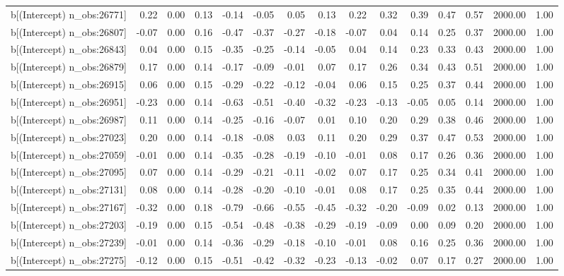 \begin{table}[ht]
\begin{tabular}{rrrrrrrrrrrrrrr}
  b[(Intercept) n\_obs:26771] & 0.22 & 0.00 & 0.13 & -0.14 & -0.05 & 0.05 & 0.13 & 0.22 & 0.32 & 0.39 & 0.47 & 0.57 & 2000.00 & 1.00 \\ 
  b[(Intercept) n\_obs:26807] & -0.07 & 0.00 & 0.16 & -0.47 & -0.37 & -0.27 & -0.18 & -0.07 & 0.04 & 0.14 & 0.25 & 0.37 & 2000.00 & 1.00 \\ 
  b[(Intercept) n\_obs:26843] & 0.04 & 0.00 & 0.15 & -0.35 & -0.25 & -0.14 & -0.05 & 0.04 & 0.14 & 0.23 & 0.33 & 0.43 & 2000.00 & 1.00 \\ 
  b[(Intercept) n\_obs:26879] & 0.17 & 0.00 & 0.14 & -0.17 & -0.09 & -0.01 & 0.07 & 0.17 & 0.26 & 0.34 & 0.43 & 0.51 & 2000.00 & 1.00 \\ 
  b[(Intercept) n\_obs:26915] & 0.06 & 0.00 & 0.15 & -0.29 & -0.22 & -0.12 & -0.04 & 0.06 & 0.15 & 0.25 & 0.37 & 0.44 & 2000.00 & 1.00 \\ 
  b[(Intercept) n\_obs:26951] & -0.23 & 0.00 & 0.14 & -0.63 & -0.51 & -0.40 & -0.32 & -0.23 & -0.13 & -0.05 & 0.05 & 0.14 & 2000.00 & 1.00 \\ 
  b[(Intercept) n\_obs:26987] & 0.11 & 0.00 & 0.14 & -0.25 & -0.16 & -0.07 & 0.01 & 0.10 & 0.20 & 0.29 & 0.38 & 0.46 & 2000.00 & 1.00 \\ 
  b[(Intercept) n\_obs:27023] & 0.20 & 0.00 & 0.14 & -0.18 & -0.08 & 0.03 & 0.11 & 0.20 & 0.29 & 0.37 & 0.47 & 0.53 & 2000.00 & 1.00 \\ 
  b[(Intercept) n\_obs:27059] & -0.01 & 0.00 & 0.14 & -0.35 & -0.28 & -0.19 & -0.10 & -0.01 & 0.08 & 0.17 & 0.26 & 0.36 & 2000.00 & 1.00 \\ 
  b[(Intercept) n\_obs:27095] & 0.07 & 0.00 & 0.14 & -0.29 & -0.21 & -0.11 & -0.02 & 0.07 & 0.17 & 0.25 & 0.34 & 0.41 & 2000.00 & 1.00 \\ 
  b[(Intercept) n\_obs:27131] & 0.08 & 0.00 & 0.14 & -0.28 & -0.20 & -0.10 & -0.01 & 0.08 & 0.17 & 0.25 & 0.35 & 0.44 & 2000.00 & 1.00 \\ 
  b[(Intercept) n\_obs:27167] & -0.32 & 0.00 & 0.18 & -0.79 & -0.66 & -0.55 & -0.45 & -0.32 & -0.20 & -0.09 & 0.02 & 0.13 & 2000.00 & 1.00 \\ 
  b[(Intercept) n\_obs:27203] & -0.19 & 0.00 & 0.15 & -0.54 & -0.48 & -0.38 & -0.29 & -0.19 & -0.09 & 0.00 & 0.09 & 0.20 & 2000.00 & 1.00 \\ 
  b[(Intercept) n\_obs:27239] & -0.01 & 0.00 & 0.14 & -0.36 & -0.29 & -0.18 & -0.10 & -0.01 & 0.08 & 0.16 & 0.25 & 0.36 & 2000.00 & 1.00 \\ 
  b[(Intercept) n\_obs:27275] & -0.12 & 0.00 & 0.15 & -0.51 & -0.42 & -0.32 & -0.23 & -0.13 & -0.02 & 0.07 & 0.17 & 0.27 & 2000.00 & 1.00 \\ 

\end{tabular}
\end{table}
